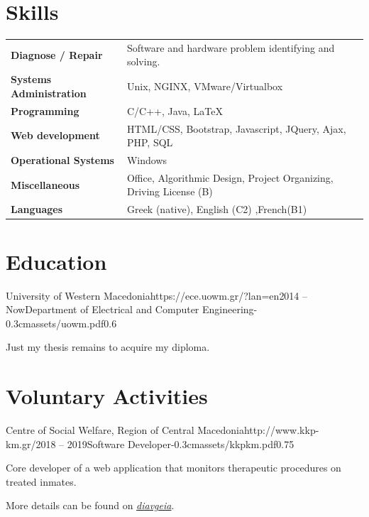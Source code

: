 \documentclass{mycv}
\begin{document}
	\section{Skills}
	\begin{tabular}{m{4.5cm} m{13cm}}
		\textbf{Diagnose / Repair}     & Software and hardware problem identifying and solving. \\
		\textbf{Systems Administration}& Unix, NGINX, VMware/Virtualbox \\
		\textbf{Programming} 	 	   & C/C++, Java, \LaTeX \\
		\textbf{Web development}	   & HTML/CSS, Bootstrap, Javascript, JQuery, Ajax, PHP, SQL \\
		\textbf{Operational Systems}   & Windows \\
		\textbf{Miscellaneous}         & Office, Algorithmic Design, Project Organizing, Driving License (B) \\
		\textbf{Languages} 			   & Greek (native), English (C2) ,French(B1)
	\end{tabular}

	\section{Education}

	\begin{EntryDatedLogo}{University of Western Macedonia}{https://ece.uowm.gr/?lan=en}{2014 -- Now}{Department of Electrical and Computer Engineering}{-0.3cm}{assets/uowm.pdf}{0.6}
	\begin{Itemize}
		\item Just my thesis remains to acquire my diploma.
	\end{Itemize}
	\end{EntryDatedLogo}

	\section{Voluntary Activities}
	\begin{EntryDatedLogo}{Centre of Social Welfare, Region of Central Macedonia}{http://www.kkp-km.gr/}{2018 -- 2019}{Software Developer}{-0.3cm}{assets/kkpkm.pdf}{0.75}
		\begin{Itemize}
			\item Core developer of a web application that monitors therapeutic procedures on treated inmates.
			\item More details can be found on \href{https://diavgeia.gov.gr/decision/view/\%CE\%A8\%CE\%A6\%CE\%A1\%CE\%93\%CE\%9F\%CE\%9E\%CE\%A7\%CE\%A3-\%CE\%A0\%CE\%93\%CE\%A6}{\textit{diavgeia}}.
		\end{Itemize}
	\end{EntryDatedLogo}
\end{document}
